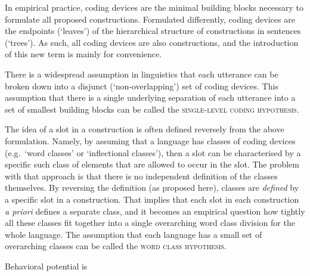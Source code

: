 In empirical practice, coding devices are the minimal building blocks necessary to formulate all proposed constructions. Formulated differently, coding devices are the endpoints (`leaves') of the hierarchical structure of constructions in sentences (`trees'). As such, all coding devices are also constructions, and the introduction of this new term is mainly for convenience.

There is a widespread assumption in linguistics that each utterance can be broken down into a disjunct (`non-overlapping') set of coding devices. This assumption that there is a single underlying separation of each utterance into a set of smallest building blocks can be called the \textsc{single-level coding hypothesis}.

%
The idea of a slot in a construction is often defined reversely from the above formulation. Namely, by assuming that a language has classes of coding devices (e.g.~`word classes' or `inflectional classes'), then a slot can be characterised by a specific such class of elements that are allowed to occur in the slot. The problem with that approach is that there is no independent definition of the classes themselves. By reversing the definition (as proposed here), classes are \emph{defined} by a specific slot in a construction. That implies that each slot in each construction \emph{a priori} defines a separate class, and it becomes an empirical question how tightly all these classes fit together into a single overarching word class division for the whole language. The assumption that each language has a small set of overarching classes can be called the \textsc{word class hypothesis}.

%
Behavioral potential is 

